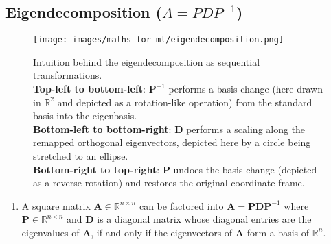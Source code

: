 \subsection{Eigendecomposition ($A = P DP ^{-1}$)}

\begin{figure}[H]
    \centering
    \texttt{[image: images/maths-for-ml/eigendecomposition.png]}
    \caption*{
        Intuition behind the eigendecomposition as sequential transformations.
        \\
        \textbf{Top-left to bottom-left}: $\bm{P}^{-1}$ performs a basis change (here drawn in $\mathbb{R}^2$ and depicted as a rotation-like operation) from the standard basis into the eigenbasis.
        \\
        \textbf{Bottom-left to bottom-right}: $\bm{D}$ performs a scaling along the remapped orthogonal eigenvectors, depicted here by a circle being stretched to an ellipse. 
        \\
        \textbf{Bottom-right to top-right}: $\bm{P}$ undoes the basis change (depicted as a reverse rotation) and restores the original coordinate frame.
    }
\end{figure}


\begin{enumerate}
    \item 
    \begin{theorem}[Eigendecomposition]
        A square matrix $\bm{A} \in \mathbb{R}^{n\times n}$ can be factored into $\bm{A} = \bm{PDP}^{-1}$ where $\bm{P} \in \mathbb{R}^{n\times n}$ and $\bm{D}$ is a diagonal matrix whose diagonal entries are the eigenvalues of $\bm{A}$, if and only if the eigenvectors of $\bm{A}$ form a basis of $\mathbb{R}^n$.
        \hfill \cite{mfml/book/mml/Deisenroth-Faisal-Ong}
    \end{theorem}
\end{enumerate}








